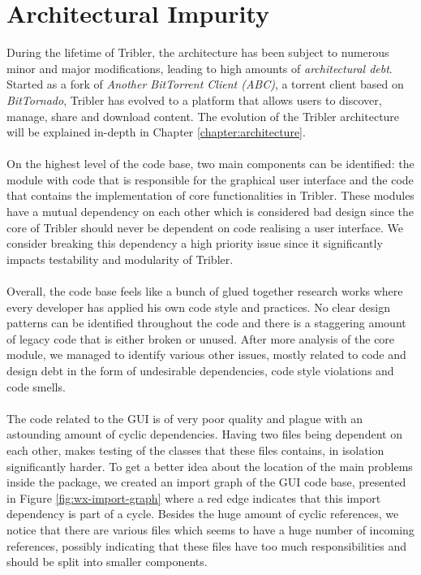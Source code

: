 \section{Architectural Impurity}
During the lifetime of Tribler, the architecture has been subject to numerous minor and major modifications, leading to high amounts of \emph{architectural debt}. Started as a fork of \emph{Another BitTorrent Client (ABC)}, a torrent client based on \emph{BitTornado}, Tribler has evolved to a platform that allows users to discover, manage, share and download content. The evolution of the Tribler architecture will be explained in-depth in Chapter \ref{chapter:architecture}.\\\\
On the highest level of the code base, two main components can be identified: the module with code that is responsible for the graphical user interface and the code that contains the implementation of core functionalities in Tribler. These modules have a mutual dependency on each other which is considered bad design since the core of Tribler should never be dependent on code realising a user interface. We consider breaking this dependency a high priority issue since it significantly impacts testability and modularity of Tribler.\\\\
Overall, the code base feels like a bunch of glued together research works where every developer has applied his own code style and practices. No clear design patterns can be identified throughout the code and there is a staggering amount of legacy code that is either broken or unused. After more analysis of the core module, we managed to identify various other issues, mostly related to code and design debt in the form of undesirable dependencies, code style violations and code smells.\\\\
The code related to the GUI is of very poor quality and plague with an astounding amount of cyclic dependencies. Having two files being dependent on each other, makes testing of the classes that these files contains, in isolation significantly harder. To get a better idea about the location of the main problems inside the package, we created an import graph of the GUI code base, presented in Figure \ref{fig:wx-import-graph} where a red edge indicates that this import dependency is part of a cycle. Besides the huge amount of cyclic references, we notice that there are various files which seems to have a huge number of incoming references, possibly indicating that these files have too much responsibilities and should be split into smaller components.\\

